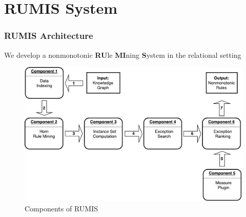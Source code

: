\documentclass{beamer}
\newcommand{\makeoverview}{%
  \begin{frame}
    \frametitle{Outline}
    \tableofcontents
  \end{frame}
}
\newcommand{\bl}[1]{\textcolor{blue}{#1}}
\newcommand{\gr}[1]{\textcolor{darkgreen}{#1}}
\def\cG{\ensuremath{\mathcal{G}}}
\def\cR{\ensuremath{\mathcal{R}}}
\newcommand{\mi}[1]{\ensuremath{\mathit{#1}}}
\begin{document}





\section{RUMIS System}


\begin{frame}\frametitle{RUMIS Architecture}

\bigskip
We develop a nonmonotonic \textbf{RU}le \textbf{MI}ning \textbf{S}ystem in the relational setting
\smallskip

\begin{figure}[h]
	\centering
	\includegraphics[page=1,width=.75\textwidth]{system_overview.pdf}
	\caption{Components of RUMIS}
\end{figure}

\end{frame}
\end{document}
